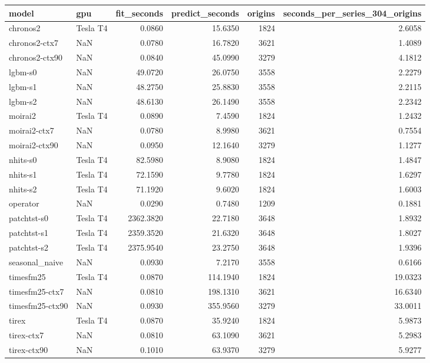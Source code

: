 \begin{tabular}{llrrrr}
\toprule
model & gpu & fit_seconds & predict_seconds & origins & seconds_per_series_304_origins \\
\midrule
chronos2 & Tesla T4 & 0.0860 & 15.6350 & 1824 & 2.6058 \\
chronos2-ctx7 & NaN & 0.0780 & 16.7820 & 3621 & 1.4089 \\
chronos2-ctx90 & NaN & 0.0840 & 45.0990 & 3279 & 4.1812 \\
lgbm-s0 & NaN & 49.0720 & 26.0750 & 3558 & 2.2279 \\
lgbm-s1 & NaN & 48.2750 & 25.8830 & 3558 & 2.2115 \\
lgbm-s2 & NaN & 48.6130 & 26.1490 & 3558 & 2.2342 \\
moirai2 & Tesla T4 & 0.0890 & 7.4590 & 1824 & 1.2432 \\
moirai2-ctx7 & NaN & 0.0780 & 8.9980 & 3621 & 0.7554 \\
moirai2-ctx90 & NaN & 0.0950 & 12.1640 & 3279 & 1.1277 \\
nhits-s0 & Tesla T4 & 82.5980 & 8.9080 & 1824 & 1.4847 \\
nhits-s1 & Tesla T4 & 72.1590 & 9.7780 & 1824 & 1.6297 \\
nhits-s2 & Tesla T4 & 71.1920 & 9.6020 & 1824 & 1.6003 \\
operator & NaN & 0.0290 & 0.7480 & 1209 & 0.1881 \\
patchtst-s0 & Tesla T4 & 2362.3820 & 22.7180 & 3648 & 1.8932 \\
patchtst-s1 & Tesla T4 & 2359.3520 & 21.6320 & 3648 & 1.8027 \\
patchtst-s2 & Tesla T4 & 2375.9540 & 23.2750 & 3648 & 1.9396 \\
seasonal_naive & NaN & 0.0930 & 7.2170 & 3558 & 0.6166 \\
timesfm25 & Tesla T4 & 0.0870 & 114.1940 & 1824 & 19.0323 \\
timesfm25-ctx7 & NaN & 0.0810 & 198.1310 & 3621 & 16.6340 \\
timesfm25-ctx90 & NaN & 0.0930 & 355.9560 & 3279 & 33.0011 \\
tirex & Tesla T4 & 0.0870 & 35.9240 & 1824 & 5.9873 \\
tirex-ctx7 & NaN & 0.0810 & 63.1090 & 3621 & 5.2983 \\
tirex-ctx90 & NaN & 0.1010 & 63.9370 & 3279 & 5.9277 \\
\bottomrule
\end{tabular}
